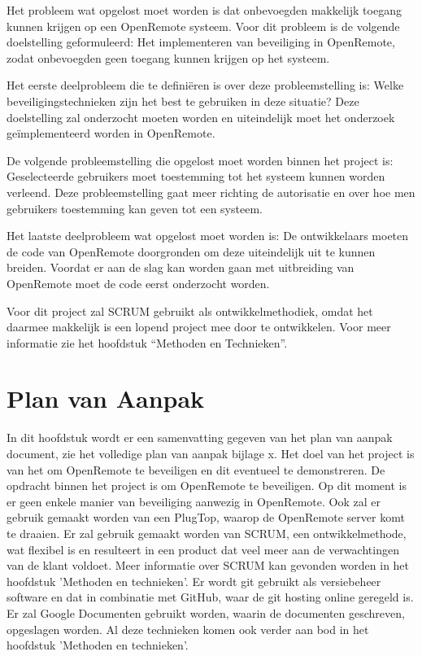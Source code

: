 \documentclass[]{article}
\begin{document}
Het probleem wat opgelost moet worden is dat onbevoegden makkelijk toegang
kunnen krijgen op een OpenRemote systeem. Voor dit probleem is de
volgende doelstelling geformuleerd: Het implementeren van beveiliging in
OpenRemote, zodat onbevoegden geen toegang kunnen krijgen op het systeem.

Het eerste deelprobleem die te definiëren is over deze probleemstelling is:
Welke beveiligingstechnieken zijn het best te gebruiken in deze situatie?
Deze doelstelling zal onderzocht moeten worden en uiteindelijk moet het
onderzoek geïmplementeerd worden in OpenRemote.

De volgende probleemstelling die opgelost moet worden binnen het project
is: Geselecteerde gebruikers moet toestemming tot het systeem kunnen worden
verleend. Deze probleemstelling gaat meer richting de autorisatie en over
hoe men gebruikers toestemming kan geven tot een systeem.

Het laatste deelprobleem wat opgelost moet worden is: De ontwikkelaars
moeten de code van OpenRemote doorgronden om deze uiteindelijk uit te
kunnen breiden. Voordat er aan de slag kan worden gaan met uitbreiding van
OpenRemote moet de code eerst onderzocht worden.

Voor dit project zal SCRUM gebruikt als ontwikkelmethodiek, omdat het
daarmee makkelijk is een lopend project mee door te ontwikkelen. Voor meer
informatie zie het hoofdstuk “Methoden en Technieken”.

\newpage
\section{Plan van Aanpak}

In dit hoofdstuk wordt er een samenvatting gegeven van het plan  van  aanpak
document, zie het volledige plan van aanpak bijlage  x.  Het  doel  van  het
project is  van  het  om  OpenRemote  te  beveiligen  en  dit  eventueel  te
demonstreren.  De  opdracht  binnen  het  project  is   om   OpenRemote   te
beveiligen. Op dit moment is er geen enkele manier van beveiliging  aanwezig
in OpenRemote. Ook zal er gebruik gemaakt worden van een PlugTop, waarop  de
OpenRemote server komt te draaien. Er zal gebruik gemaakt worden van  SCRUM,
een ontwikkelmethode, wat flexibel is en resulteert in een product dat  veel
meer aan de verwachtingen van de klant voldoet. Meer informatie  over  SCRUM
kan gevonden worden in het hoofdstuk 'Methoden en technieken'.
Er wordt git gebruikt als versiebeheer software en  dat  in  combinatie  met
GitHub, waar de git hosting online geregeld is.  Er  zal  Google  Documenten
gebruikt worden, waarin de documenten geschreven, opgeslagen worden.
Al deze technieken komen ook verder aan bod in het  hoofdstuk  'Methoden  en
technieken'.
\end{document}
